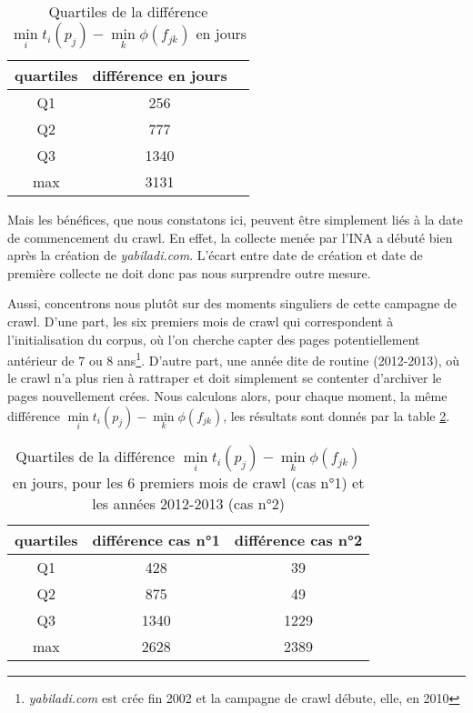 \documentclass[symmetric,justified,marginals=raggedouter]{tufte-book}
\begin{document}
\begin{table}
\hspace{2em}%
  \label{tab:quartiles_1}
  \begin{tabular}{ccl}
    \toprule
    quartiles&différence en jours\\
    \midrule
    Q1 & 256\\
    Q2 & 777\\
    Q3 & 1340\\    
    max & 3131\\  
  \bottomrule
\end{tabular}
  \bigskip
  \caption{Quartiles de la différence $\min\limits_{i} t_i(p_j) - \min\limits_{k} \phi(f_{jk})$ en jours}
\end{table} 

\noindent Mais les bénéfices, que nous constatons ici, peuvent être simplement liés à la date de commencement du crawl. En effet, la collecte menée par l'INA a débuté bien après la création de \textit{yabiladi.com}. L'écart entre date de création et date de première collecte ne doit donc pas nous surprendre outre mesure.

Aussi, concentrons nous plutôt sur des moments singuliers de cette campagne de crawl. D'une part, les six premiers mois de crawl qui correspondent à l'initialisation du corpus, où l'on cherche capter des pages potentiellement antérieur de 7 ou 8 ans\footnote{\textit{yabiladi.com} est crée fin 2002 et la campagne de crawl débute, elle, en 2010}. D'autre part, une année dite de routine (2012-2013), où le crawl n'a plus rien à rattraper et doit simplement se contenter d'archiver le pages nouvellement crées. Nous calculons alors, pour chaque moment, la même différence $\min\limits_{i} t_i(p_j) - \min\limits_{k} \phi(f_{jk})$, les résultats sont donnés par la table \ref{tab:quartiles_2}.

\begin{table}
\hspace{2em}%
  \label{tab:quartiles_2}
  \begin{tabular}{ccc}
    \toprule
    quartiles&différence cas n°1&différence cas n°2\\
    \midrule
    Q1 & 428 & 39\\
    Q2 & 875 & 49\\
    Q3 & 1340 & 1229\\
    max & 2628 & 2389\\      
  \bottomrule
\end{tabular}
  \bigskip
  \caption{Quartiles de la différence $\min\limits_{i} t_i(p_j) - \min\limits_{k} \phi(f_{jk})$ en jours, pour les 6 premiers mois de crawl (cas n°1) et les années 2012-2013 (cas n°2)}
\end{table} 
\end{document}
